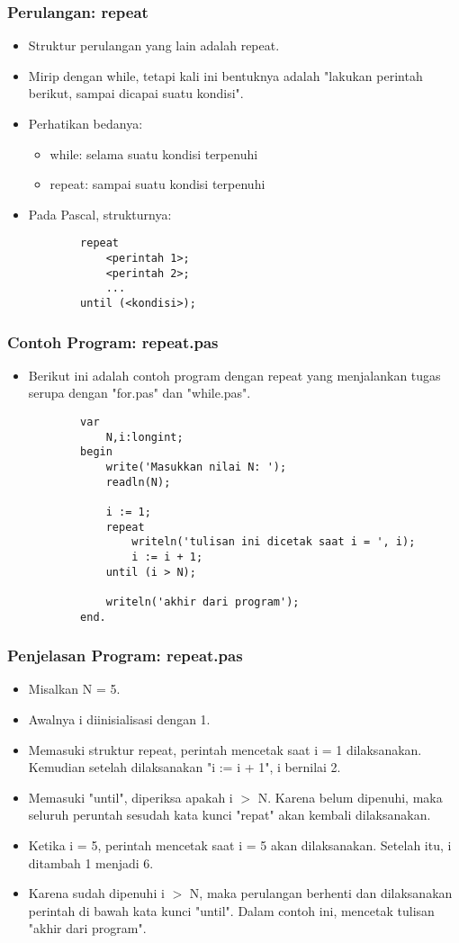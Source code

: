 \documentclass{beamer}
\begin{document}
\begin{frame}[fragile]
\frametitle{Perulangan: repeat}
\begin{itemize}
	\item Struktur perulangan yang lain adalah repeat.
	\item Mirip dengan while, tetapi kali ini bentuknya adalah "lakukan perintah berikut, sampai dicapai suatu kondisi".
	\item Perhatikan bedanya:
	\begin{itemize}
		\item while: selama suatu kondisi terpenuhi
		\item repeat: sampai suatu kondisi terpenuhi
	\end{itemize}
	\item Pada Pascal, strukturnya:
	\begin{lstlisting}
		repeat
		    <perintah 1>;
		    <perintah 2>;
		    ...
		until (<kondisi>);
	\end{lstlisting}
\end{itemize}
\end{frame}

\begin{frame}[fragile]
\frametitle{Contoh Program: repeat.pas}
\begin{itemize}
	\item Berikut ini adalah contoh program dengan repeat yang menjalankan tugas serupa dengan "for.pas" dan "while.pas".
	\begin{lstlisting}
		var
		    N,i:longint;
		begin
		    write('Masukkan nilai N: ');
		    readln(N);
		
		    i := 1;
		    repeat
		        writeln('tulisan ini dicetak saat i = ', i);
		        i := i + 1;
		    until (i > N);
		
		    writeln('akhir dari program');
		end.
	\end{lstlisting}
\end{itemize}
\end{frame}

\begin{frame}
\frametitle{Penjelasan Program: repeat.pas}
\begin{itemize}
	\item Misalkan N = 5.
	\item Awalnya i diinisialisasi dengan 1.
	\item Memasuki struktur repeat, perintah mencetak saat i = 1 dilaksanakan. Kemudian setelah dilaksanakan "i := i + 1", i bernilai 2.
	\item Memasuki "until", diperiksa apakah i $>$ N. Karena belum dipenuhi, maka seluruh peruntah sesudah kata kunci "repat" akan kembali dilaksanakan.
	\item Ketika i = 5, perintah mencetak saat i = 5 akan dilaksanakan. Setelah itu, i ditambah 1 menjadi 6.
	\item Karena sudah dipenuhi i $>$ N, maka perulangan berhenti dan dilaksanakan perintah di bawah kata kunci "until". Dalam contoh ini, mencetak tulisan "akhir dari program".
\end{itemize}
\end{frame}
\end{document}
